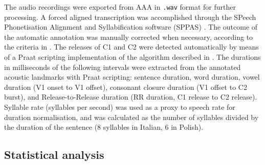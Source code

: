 \documentclass[preprint]{JASAnew}
\begin{document}

The audio recordings were exported from AAA in \texttt{.wav} format for
further processing. A forced aligned transcription was accomplished
through the SPeech Phonetisation Alignment and Syllabification software
(SPPAS) \citep{bigi2015}. The outcome of the automatic annotation was
manually corrected when necessary, according to the criteria in
. The releases of C1 and C2 were detected
automatically by means of a Praat scripting implementation of the
algorithm described in \citet{ananthapadmanabha2014}. The durations in
milliseconds of the following intervals were extracted from the
annotated acoustic landmarks with Praat scripting: sentence duration,
word duration, vowel duration (V1 onset to V1 offset), consonant closure
duration (V1 offset to C2 burst), and Release-to-Release duration (RR
duration, C1 release to C2 release). Syllable rate (syllables per
second) was used as a proxy to speech rate \citep{plug2018} for duration
normalisation, and was calculated as the number of syllables divided by
the duration of the sentence (8 syllables in Italian, 6 in Polish).

\hypertarget{statistical-analysis}{%
\subsection{Statistical analysis}\label{statistical-analysis}}
\end{document}
